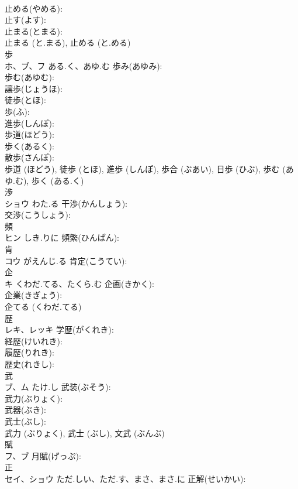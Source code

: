 \documentclass[8pt]{extreport}
\begin{document}
\begin{CJK}{UTF8}{min}
\\	止める(やめる): 
\\	止す(よす): 
\\	止まる(とまる): 
\\	止まる (と.まる), 止める (と.める)
\\	歩			
\\	ホ、ブ、フ	ある.く、あゆ.む	歩み(あゆみ): 
\\	歩む(あゆむ): 
\\	譲歩(じょうほ): 
\\	徒歩(とほ): 
\\	歩(ふ): 
\\	進歩(しんぽ): 
\\	歩道(ほどう): 
\\	歩く(あるく): 
\\	散歩(さんぽ): 
\\	歩道 (ほどう), 徒歩 (とほ), 進歩 (しんぽ), 歩合 (ぶあい), 日歩 (ひぶ), 歩む (あゆ.む), 歩く (ある.く)
\\	渉			
\\	ショウ	わた.る	干渉(かんしょう): 
\\	交渉(こうしょう): 
\\	頻			
\\	ヒン	しき.りに	頻繁(ひんぱん): 
\\	肯		
\\	コウ	がえんじ.る	肯定(こうてい): 
\\	企		
\\	キ	くわだ.てる、たくら.む	企画(きかく): 
\\	企業(きぎょう): 
\\	企てる (くわだ.てる)
\\	歴			
\\	レキ、レッキ		学歴(がくれき): 
\\	経歴(けいれき): 
\\	履歴(りれき): 
\\	歴史(れきし): 
\\	武			
\\	ブ、ム	たけ.し	武装(ぶそう): 
\\	武力(ぶりょく): 
\\	武器(ぶき): 
\\	武士(ぶし): 
\\	武力 (ぶりょく), 武士 (ぶし), 文武 (ぶんぶ)
\\	賦			
\\	フ、ブ		月賦(げっぷ): 
\\	正			
\\	セイ、ショウ	ただ.しい、ただ.す、まさ、まさ.に	正解(せいかい): 

\end{CJK}
\end{document}
